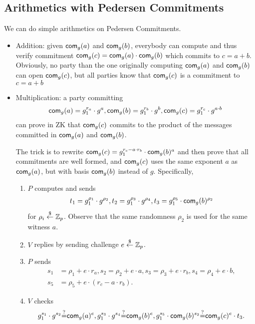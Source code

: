 \documentclass{article}
\begin{document}
\subsection{Arithmetics with Pedersen Commitments}
We can do simple arithmetics on Pedersen Commitments.
\begin{itemize}
\item Addition: given $\mathsf{com}_g(a)$ and $\mathsf{com}_g(b)$, everybody can
  compute and thus verify commitment
  $\mathsf{com}_g(c)=\mathsf{com}_g(a)\cdot{}\mathsf{com}_g(b)$ which commits to
  $c=a+b$. Obviously, no party than the one originally computing
  $\mathsf{com}_g(a)$ and $\mathsf{com}_g(b)$ can open $\mathsf{com}_g(c)$, but all parties
  know that $\mathsf{com}_g(c)$ is a commitment to $c=a+b$
  
\item Multiplication: a party committing
  \begin{align*}
  \mathsf{com}_g(a)=g_1^{r_a}\cdot{}g^a, \mathsf{com}_g(b)=g_1^{r_b}\cdot{}g^b,
  \mathsf{com}_g(c)=g_1^{r_c}\cdot{}g^{a\cdot{}b}
  \end{align*}
  can prove in ZK that
  $\mathsf{com}_g(c)$ commits to the product of the messages committed in
  $\mathsf{com}_g(a)$ and $\mathsf{com}_g(b)$.

  The trick is to rewrite
  $\mathsf{com}_g(c)=g_1^{r_c-a\cdot{}r_b}\cdot\mathsf{com}_g(b)^{a}$ and then prove
  that all commitments are well formed, and $\mathsf{com}_g(c)$ uses the same
  exponent $a$ as $\mathsf{com}_g(a)$, but with basis $\mathsf{com}_g(b)$ instead of
  $g$. Specifically,
  \begin{enumerate}
  \item $P$ computes and sends
    \begin{align*}
      t_1=g_1^{\rho_1}\cdot{}g^{\rho_2},
      t_2=g_1^{\rho_3}\cdot{}g^{\rho_4},
      t_3=g_1^{\rho_5}\cdot{}\mathsf{com}_g(b)^{\rho_2}
      \end{align*}
      for $\rho_i\stackrel{\$}{\leftarrow}\mathbb{Z}_p$. Observe that the same randomness $\rho_2$
      is used for the same witness $a$.
    \item $V$ replies by sending challenge $e\stackrel{\$}{\leftarrow}\mathbb{Z}_p$.
    \item $P$ sends
      \begin{align*}
        s_1&=\rho_1+e\cdot{}r_a,s_2=\rho_2+e\cdot{}a,s_3=\rho_3+e\cdot{}r_b,s_4=\rho_4+e\cdot{}b,\\s_5&=\rho_5+e\cdot{}(r_c-a\cdot{}r_b).
        \end{align*}
    \item $V$ checks
      \begin{align*}
        g_1^{s_1}\cdot{}g^{s_2}{\stackrel{?}{=}}{}\mathsf{com}_g(a)^e, g_1^{s_3}\cdot{}g^{s_4}{\stackrel{?}{=}}{}\mathsf{com}_g(b)^e, g_1^{s_5}\cdot{}\mathsf{com}_g(b)^{s_2}{\stackrel{?}{=}}{}\mathsf{com}_g(c)^e\cdot{}t_3.
        \end{align*}
\end{enumerate}


\end{itemize}
\end{document}
